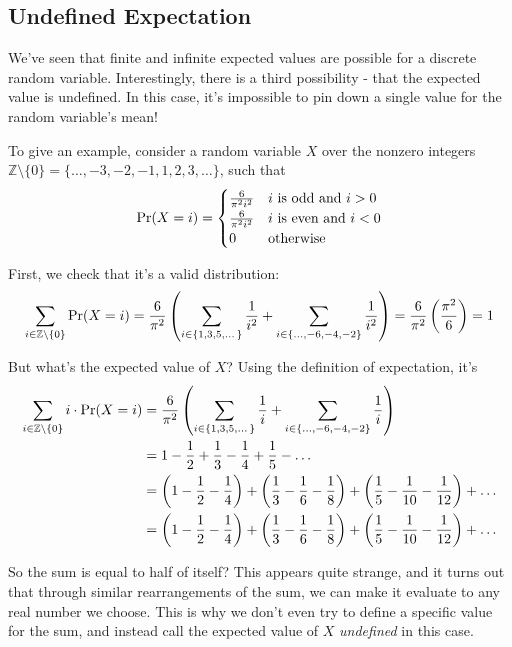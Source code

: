 \subsection{Undefined Expectation}
We've seen that finite and infinite expected values are possible for a discrete random variable. 
Interestingly, there is a third possibility - that the expected value is undefined. 
In this case, it's impossible to pin down a single value for the random variable's mean!

To give an example, consider a random variable $X$ over the nonzero integers $\mathbb{Z} \setminus \{0\} = \{\dots, -3, -2, -1, 1, 2, 3, \dots\}$, 
such that 
$$\mbox{\rm Pr}(X = i) = \begin{cases} \frac{6}{\pi^2 i^2} & i \text{ is odd and } i > 0 \\ \frac{6}{\pi^2 i^2} & i \text{ is even and } i < 0 \\ 0 & \text{otherwise} \end{cases} $$

First, we check that it's a valid distribution: 
$$ \sum_{i \in \mathbb{Z} \setminus \{0\}} \mbox{\rm Pr}(X = i)
= \frac{6}{\pi^2} \left( \sum_{i \in \{ 1, 3, 5, \dots \}} \frac{1}{i^2} + \sum_{i \in \{\dots, -6, -4, -2 \}} \frac{1}{i^2} \right) 
= \frac{6}{\pi^2} \left( \frac{\pi^2}{6} \right) = 1 $$

But what's the expected value of $X$? 
Using the definition of expectation, it's 
\begin{align*}
\sum_{i \in \mathbb{Z} \setminus \{0\}} i \cdot \mbox{\rm Pr}(X = i) 
&= \frac{6}{\pi^2} \left( \sum_{i \in \{ 1, 3, 5, \dots \}} \frac{1}{i} + \sum_{i \in \{\dots, -6, -4, -2 \}} \frac{1}{i} \right) \\
&= 1 - \frac{1}{2} + \frac{1}{3} - \frac{1}{4} + \frac{1}{5} - \dots \\
&= \left( 1 - \frac{1}{2} - \frac{1}{4} \right) + \left( \frac{1}{3} - \frac{1}{6} - \frac{1}{8} \right) + \left( \frac{1}{5} - \frac{1}{10} - \frac{1}{12} \right) + \dots \\
&= \left( 1 - \frac{1}{2} - \frac{1}{4} \right) + \left( \frac{1}{3} - \frac{1}{6} - \frac{1}{8} \right) + \left( \frac{1}{5} - \frac{1}{10} - \frac{1}{12} \right) + \dots
\end{align*}

So the sum is equal to half of itself? 
This appears quite strange, and it turns out that through similar rearrangements of the sum, we can make it evaluate to any real number we choose. 
This is why we don't even try to define a specific value for the sum, and instead call the expected value of $X$ \emph{undefined} in this case.

